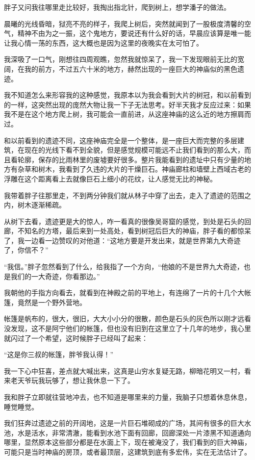 胖子又问我往哪里走比较好，我掏出指北针，爬到树上，想学潘子的做法。

晨曦的光线昏暗，狱亮不亮的样子，我爬上树后，突然就闻到了一股极度清馨的空气，精神不由为之一振，这个鬼地方，要说还有什么好的话，早晨应该算是唯一能让我心情一荡的东西，这大概也是因为这里的夜晚实在太可怕了。

我深吸了一口气，刚想往四周观瞧，忽然我就惊呆了，我一下发现眼前无比的宽阔，在我的前方，不过五六十米的地方，赫然出现的一座巨大的神庙似的黑色遗迹。

我不知道怎么来形容我的这种感觉，我原本以为我会看到大片的树冠，和以前看到的一样，这突然出现的庞然大物让我一下子无法思考。好半天我才反应过来：如果我不是在这个地方爬上树，我可能会一直前进，从这座神庙的这么近的地方擦肩而过。

和以前看到的遗迹不同，这座神庙完全是一个整体，是一座巨大而完整的多层建筑，在现在的光线下看不到全貌，但是感觉规模可能远不止我们看到的那么大，而且看轮廓，保存的比雨林里的废墟要好很多。整片我能看到的遗址中只有少量的地方有杂草和树木，我看到了久违的大片的干燥巨石。神庙廊柱和墙壁上西域古老的浮雕在这个距离看上去就像巨石上细小的花纹，让人感觉无比的神秘。

我带着胖子往那里走，不到两分钟我们就从林子中穿了出去，走入了遗迹的范围之内，树木逐渐稀疏。

从树下去看，遗迹更是大的惊人，咋一看真的很像吴哥窟的感觉，到处是石头的回廊，不知名的方塔，最后来到一处高处，看到树冠后巨大的神庙，胖子看的都惊呆了，我一边看一边赞叹的对他道：“这地方要是开发出来，就是世界第九大奇迹了，你信不？”

“我信。”胖子忽然看到了什么，给我指了一个方向，“他娘的不是世界九大奇迹，也是我们的一大奇迹，你看那边。”

我朝他的手指方向看去，就看到在神殿之前的平地上，有连绵了一片的十几个大帐篷，竟然是一个野外营地。

帐篷是帆布的，很大，很旧，大大小小分的很散，颜色是石头的灰色所以刚才远看没发现，这不是阿宁他们的帐篷，但也没有旧到在这里立了十几年的地步，我心里就闪过了一个希望，这时候胖子已经叫了起来：

“这是你三叔的帐篷，胖爷我认得！”

我一下心中狂喜，差点就大喊出来，这真是山穷水复疑无路，柳暗花明又一村，看来老天爷玩我玩够了，想让我休息一下了。

我和胖子立即就往营地冲去，也不知道是哪里来的力量，我脑子只想着休息休息，睡觉睡觉。

我们狂奔过遗迹之前的开阔地，这是一片巨石堆砌成的广场，其间有很多的巨大水池，水是活水，非常清澈，能看到水池下面有回廊，回廊深处一片漆黑不知道通向哪里，显然原本这些部分都是在水面上下，现在被淹没了，我们看到的巨大神庙，可能只是当时神庙的房顶，或者最顶层，这建筑到底有多宏伟，实在无法估计了。

